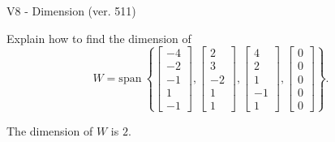 \begin{exercise}
  \begin{exerciseTitle}V8 - Dimension (ver. 511)\end{exerciseTitle}
  \begin{exerciseStatement}
    Explain how to find the dimension of 
\[W=\mathrm{span}\ \left\{\left[\begin{array}{r}
-4 \\
-2 \\
-1 \\
1 \\
-1
\end{array}\right] , \left[\begin{array}{r}
2 \\
3 \\
-2 \\
1 \\
1
\end{array}\right] , \left[\begin{array}{r}
4 \\
2 \\
1 \\
-1 \\
1
\end{array}\right] , \left[\begin{array}{r}
0 \\
0 \\
0 \\
0 \\
0
\end{array}\right]\right\}.\]



  \end{exerciseStatement}
  \begin{exerciseAnswer}
   The dimension of \(W\) is  \(2\).
  


  \end{exerciseAnswer}
\end{exercise}